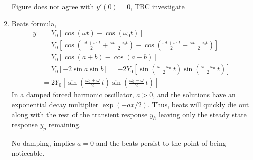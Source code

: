 \begin{enumerate}
          \begin{figure}[H]
              \centering
          \end{figure}

          Figure does not agree with $ y'(0) = 0 $, TBC investigate

    \item Beats formula,
          \begin{align}
              y & = Y_{0}[\cos(\omega t) - \cos(\omega_{0} t)]                                                        \\
                & = Y_{0}\left[\cos\left( \frac{\omega t + \omega_{0}t}{2} + \frac{\omega t - \omega_{0}t}{2} \right)
              - \cos\left( \frac{\omega t + \omega_{0}t}{2} - \frac{\omega t - \omega_{0}t}{2} \right)\right]         \\
                & = Y_{0} [\cos(a+b) - \cos(a-b)]                                                                     \\
                & = Y_{0}[-2\sin a \sin b] = -2Y_{0} \left[ \sin\left( \frac{\omega + \omega_{0}}{2}\ t \right)
              \sin\left( \frac{\omega - \omega_{0}}{2}\ t \right)\right]                                              \\
                & = 2Y_{0}\left[ \sin\left( \frac{\omega_{0} + \omega}{2}\ t \right)
                  \sin\left( \frac{\omega_{0} - \omega}{2}\ t \right)\right]
          \end{align}
          In a damped forced harmonic oscillator, $ a > 0 $, and the solutions have an
          exponential decay multiplier $ \exp(-ax/2) $. Thus, beats will quickly die out along
          with the rest of the transient response $ y_{h} $ leaving only the steady state
          response $ y_{p} $ remaining. \par
          No damping, implies $ a = 0 $ and the beats persist to the point of being noticeable.


\end{enumerate}

